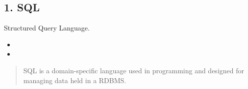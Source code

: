 \documentclass[aspectratio=169, 14pt]{beamer}
\begin{document}
{
\begin{frame}
	\section{\textcolor{darkmidnightblue}{1. SQL}}
	Structured Query Language.

	\begin{itemize}
		\item {}
		\item {}
	\end{itemize}
	\bigskip
	\begin{quote}
		SQL is a domain-specific language used in programming and designed for managing data held in a RDBMS.
	\end{quote}
\end{frame}
}
\end{document}
